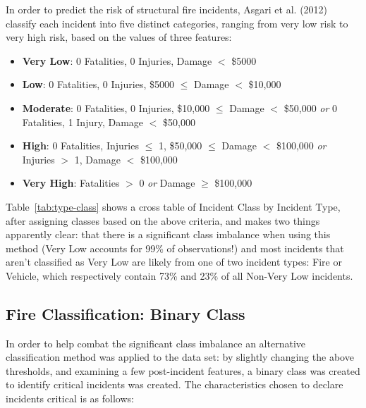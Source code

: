 \documentclass[12pt,letterpaper, oneside]
{article}
\begin{document}
In order to predict the risk of structural fire incidents, Asgari et al. (2012) classify each incident into five distinct categories, ranging from very low risk to very high risk, based on the values of three features:
\begin{itemize}
\item \textbf{Very Low}: 0 Fatalities, 0 Injuries, Damage $<$ \$5000
\item \textbf{Low}: 0 Fatalities, 0 Injuries, \$5000 $\leq$ Damage $<$ \$10,000
\item \textbf{Moderate}: 0 Fatalities, 0 Injuries, \$10,000 $\leq$ Damage $<$ \$50,000 \textit{or} 0 Fatalities, 1 Injury, Damage $<$ \$50,000
\end{itemize}

\begin{itemize}
\item \textbf{High}: 0 Fatalities, Injuries $\leq$ 1, \$50,000 $\leq$ Damage $<$ \$100,000 \textit{or} Injuries $>$ 1, Damage $<$ \$100,000
\item \textbf{Very High}: Fatalities $>$ 0 \textit{or} Damage $\geq$ \$100,000
\end{itemize}

Table~\ref{tab:type-class} shows a cross table of Incident Class by Incident Type, after assigning classes based on the above criteria, and makes two things apparently clear: that there is a significant class imbalance when using this method (Very Low accounts for 99\% of observations!) and most incidents that aren't classified as Very Low are likely from one of two incident types: Fire or Vehicle,  which respectively contain 73\% and 23\% of all Non-Very Low incidents. 

\subsection{Fire Classification: Binary Class}

In order to help combat the significant class imbalance an alternative classification method was applied to the data set: by slightly changing the above thresholds, and examining a few post-incident features, a binary class was created to identify critical incidents was created. The characteristics chosen to declare incidents critical is as follows:
\end{document}
